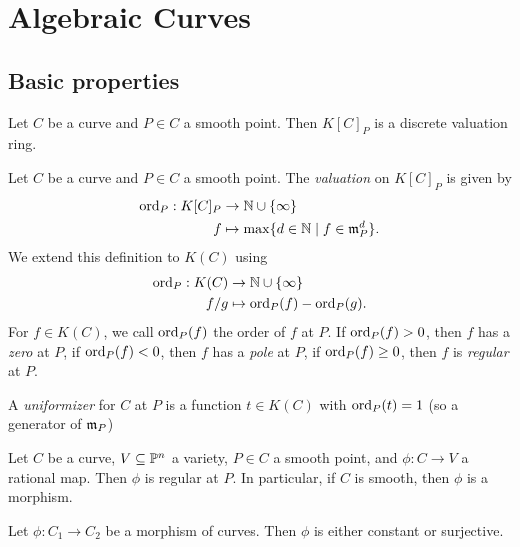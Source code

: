 \section{Algebraic Curves}

\subsection{Basic properties}

\begin{proposition}
	Let $C$ be a curve and $P \in C$ a smooth point.
	Then $K[C]_P$ is a discrete valuation ring.
\end{proposition}

\begin{definition}
	Let $C$ be a curve and $P \in C$ a smooth point. The \emph{valuation}
	on $K[C]_P$ is given by
	\begin{align*}
		\operatorname{ord}_P: K[C]_P &\to \mathbb{N}\cup\{\infty\}\\
		f &\mapsto \max\{d \in \mathbb{N} \mid f \in \mathfrak{m}_P^d\}.
	\end{align*}
	We extend this definition to $K(C)$ using
	\begin{align*}
		\operatorname{ord}_P: K(C) &\to \mathbb{N}\cup\{\infty\}\\
		f/g &\mapsto \operatorname{ord}_P(f) - \operatorname{ord}_P(g).
	\end{align*}
	For $f \in K(C)$, we call $\operatorname{ord}_P(f)$ the order of $f$ at $P$.
	If $\operatorname{ord}_P(f) > 0$, then $f$ has a \emph{zero} at $P$,
	if $\operatorname{ord}_P(f) < 0$, then $f$ has a \emph{pole} at $P$,
	if $\operatorname{ord}_P(f) \geq 0$, then $f$ is \emph{regular} at $P$.
	
	A \emph{uniformizer} for $C$ at $P$ is a function $t \in K(C)$ with
	$\operatorname{ord}_P(t) = 1$ (so a generator of $\mathfrak{m}_P$)
\end{definition}

\begin{proposition}
	Let $C$ be a curve, $V \subseteq \mathbb{P}^n$ a variety,
	$P \in C$ a smooth point, and $\phi: C \to V$ a rational map.
	Then $\phi$ is regular at $P$. In particular, if $C$ is smooth, 
	then $\phi$ is a morphism.
\end{proposition}

\begin{theorem}
	Let $\phi: C_1 \to C_2$ be a morphism of curves. Then $\phi$ is either
	constant or surjective.
\end{theorem}

